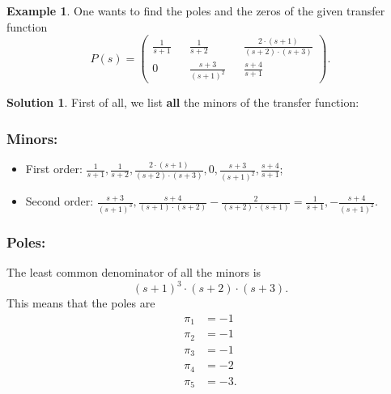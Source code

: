\documentclass[a4paper,12 pt]{article}
\numberwithin{equation}{section}
\theoremstyle{definition}
\newtheorem{bsp}{Example}
\theoremstyle{remark}
\theoremstyle{definition}
\newtheorem*{lsg}{Solution}
\theoremstyle{definition}
\theoremstyle{definition}
\theoremstyle{remark}
\begin{document}
\begin{bsp}
One wants to find the poles and the zeros of the given transfer function
$$P(s)=\begin{pmatrix}
\frac{1}{s+1} && \frac{1}{s+2} && \frac{2\cdot(s+1)}{(s+2)\cdot(s+3)} \\
0 && \frac{s+3}{(s+1)^2} && \frac{s+4}{s+1} \end{pmatrix}.$$
\newpage
\begin{lsg}
First of all, we list \textbf{all} the minors of the transfer function:
\subsubsection*{Minors:}
\begin{itemize}
\item First order:  $\frac{1}{s+1}, \frac{1}{s+2}, \frac{2\cdot(s+1)}{(s+2)\cdot(s+3)}, 0, \frac{s+3}{(s+1)^2}, \frac{s+4}{s+1}$;
\item Second order: $\frac{s+3}{(s+1)^3},\frac{s+4}{(s+1)\cdot(s+2)}-\frac{2}{(s+2)\cdot(s+1)}=\frac{1}{s+1},-\frac{s+4}{(s+1)^2}.$
\end{itemize}
\subsubsection*{Poles:}
The least common denominator of all the minors is 
\begin{equation*}
(s+1)^3\cdot(s+2)\cdot(s+3).
\end{equation*}
This means that the poles are 
\begin{equation*}
\begin{split}
\pi_1&=-1\\
\pi_2&=-1\\
\pi_3&=-1\\
\pi_4&=-2\\
\pi_5&=-3.\\
\end{split}
\end{equation*}

\end{lsg}
\end{bsp}
\end{document}

